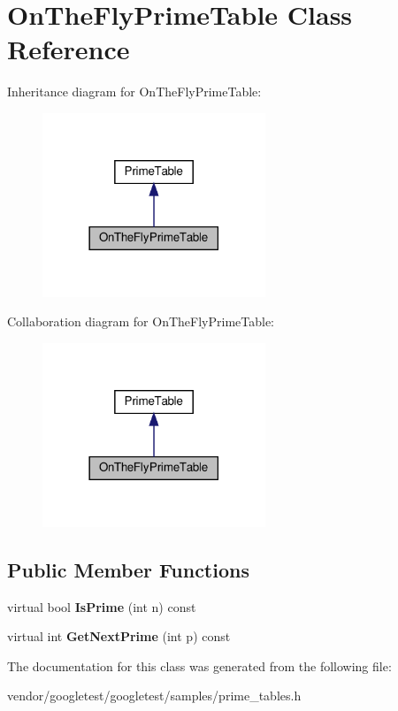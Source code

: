 \hypertarget{class_on_the_fly_prime_table}{}\section{On\+The\+Fly\+Prime\+Table Class Reference}
\label{class_on_the_fly_prime_table}


Inheritance diagram for On\+The\+Fly\+Prime\+Table\+:
\nopagebreak
\begin{figure}[H]
\begin{center}
\leavevmode
\includegraphics[width=189pt]{class_on_the_fly_prime_table__inherit__graph}
\end{center}
\end{figure}


Collaboration diagram for On\+The\+Fly\+Prime\+Table\+:
\nopagebreak
\begin{figure}[H]
\begin{center}
\leavevmode
\includegraphics[width=189pt]{class_on_the_fly_prime_table__coll__graph}
\end{center}
\end{figure}
\subsection*{Public Member Functions}
\begin{DoxyCompactItemize}
\item 
\mbox{\label{class_on_the_fly_prime_table_a1d49b78f79e018441289e79d75680067}} 
virtual bool {\bfseries Is\+Prime} (int n) const
\item 
\mbox{\label{class_on_the_fly_prime_table_a5a4644fedd95d33136723f33b9302bfc}} 
virtual int {\bfseries Get\+Next\+Prime} (int p) const
\end{DoxyCompactItemize}


The documentation for this class was generated from the following file\+:\begin{DoxyCompactItemize}
\item 
vendor/googletest/googletest/samples/prime\+\_\+tables.\+h\end{DoxyCompactItemize}
